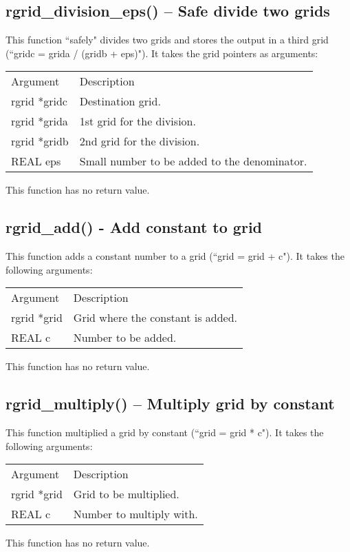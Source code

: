 \documentclass[12pt,letterpaper]{report}
\begin{document}
\subsection{rgrid\_division\_eps() -- Safe divide two grids}

This function ``safely" divides two grids and stores the output in a third grid (``gridc = grida / (gridb + eps)"). It takes the grid pointers as arguments:
\begin{longtable}{p{} p{}}
Argument & Description\\
\cline{1-2}
rgrid *gridc & Destination grid.\\
rgrid *grida & 1st grid for the division.\\
rgrid *gridb & 2nd grid for the division.\\
REAL eps & Small number to be added to the denominator.\\
\end{longtable}
\noindent
This function has no return value.

\subsection{rgrid\_add() - Add constant to grid}

This function adds a constant number to a grid (``grid = grid + c"). It takes the following arguments:
\begin{longtable}{p{} p{}}
Argument & Description\\
\cline{1-2}
rgrid *grid & Grid where the constant is added.\\
REAL c & Number to be added.\\
\end{longtable}
\noindent
This function has no return value.

\subsection{rgrid\_multiply() -- Multiply grid by constant}

This function multiplied a grid by constant (``grid = grid * c"). It takes the following arguments:
\begin{longtable}{p{} p{}}
Argument & Description\\
\cline{1-2}
rgrid *grid & Grid to be multiplied.\\
REAL c & Number to multiply with.\\
\end{longtable}
\noindent
This function has no return value.
\end{document}
